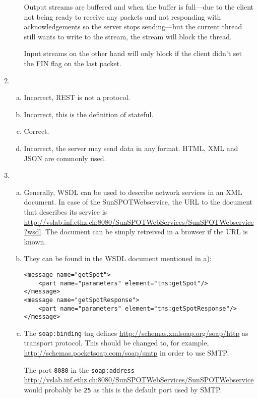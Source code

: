 \documentclass[11pt]{article}
\begin{document}
\begin{enumerate}
\begin{enumerate}[a)]
Output streams are buffered and when the buffer is full---due to the client not being ready to receive any packets and not responding with acknowledgements so the server stops sending---but the current thread still wants to write to the stream, the stream will block the thread.

Input streams on the other hand will only block if the client didn't set the FIN flag on the last packet.

\end{enumerate}

\item
\begin{enumerate}[a)]

\item Incorrect, REST is not a protocol.
\item Incorrect, this is the definition of stateful.
\item Correct.
\item Incorrect, the server may send data in any format. HTML, XML and JSON are commonly used.

\end{enumerate}

\item
\begin{enumerate}[a)]

\item
Generally, WSDL can be used to describe network services in an XML document. In case of the SunSPOTWebservice, the URL to the document that describes its service is \\ \url{http://vslab.inf.ethz.ch:8080/SunSPOTWebServices/SunSPOTWebservice?wsdl}. The document can be simply retreived in a browser if the URL is known.

\item
They can be found in the WSDL document mentioned in a):
\begin{lstlisting}
<message name="getSpot">
	<part name="parameters" element="tns:getSpot"/>
</message>
<message name="getSpotResponse">
	<part name="parameters" element="tns:getSpotResponse"/>
</message>
\end{lstlisting}

\item
The \lstinline{soap:binding} tag defines \url{http://schemas.xmlsoap.org/soap/http} as transport protocol. This should be changed to, for example, \url{http://schemas.pocketsoap.com/soap/smtp} in order to use SMTP.

The port \lstinline{8080} in the \lstinline{soap:address} \url{http://vslab.inf.ethz.ch:8080/SunSPOTWebServices/SunSPOTWebservice} would probably be \lstinline{25} as this is the default port used by SMTP.


\end{enumerate}
\end{enumerate}
\end{document}
